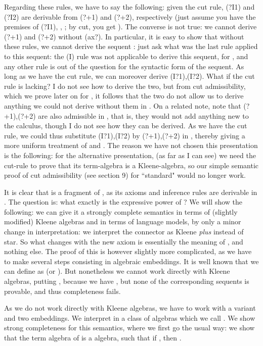 \documentclass{eptcs}
\begin{document}
Regarding these rules, we have to say the following: given 
the cut rule, (?I1) and (?I2) are derivable from (?+1) and (?+2),
respectively (just assume you have the premises of (?I1), 
, ; by cut, you get
). The converse is not true: 
we cannot derive (?+1) and (?+2) without (ax?). In particular, it is easy to 
show that without these rules, we cannot derive the sequent
: just ask what was the
last rule applied to this sequent: the 
(I) rule was not applicable to derive this sequent, 
for , and any other rule is out of 
the question for the syntactic form of the sequent.
As long as we have the cut rule, we can moreover
derive (I?1),(I?2). What if the cut rule is lacking? I
do not see how to derive the two, but from 
cut admissibility, which we prove later on
for , it follows that the two do not allow
us to derive anything we could not derive without them in
 . 
On a related note, note that
(?+1),(?+2) are also admissible in , that is, they would not
add anything new to the calculus, though I do not see how they 
can be derived. As we have the cut rule, we could thus
substitute (I?1),(I?2) by (?+1),(?+2) in , thereby 
giving a more uniform treatment of  and . The 
reason we have not chosen this presentation is the 
following: for the alternative
presentation, (as far as I can see) 
we need the cut-rule to prove that its term-algebra is a Kleene-algebra,
so our simple semantic proof of cut admissibility (see section 9)
for ``standard"  would no longer work.





It is clear that  is a fragment 
of , as its axioms and inference rules
are derivable in . The question is: what exactly is the expressive
power of ? We will show the following: we can give it
a strongly complete semantics
in terms of (slightly modified) Kleene algebras and in terms of language models,
by only a minor change in interpretation: we interpret 
the connector  as Kleene \textit{plus} instead of star. So
what changes with the new axiom is essentially the meaning of ,
and nothing else. The proof of this is however slightly more
complicated, as we have to make several steps consisting in algebraic
embeddings. It is well known that we can 
define  as  (or ). But nonetheless we cannot
work directly with Kleene algebras, putting 
, because we have
, but none of the corresponding sequents is provable,
and thus completeness fails.

As we do not work directly with
Kleene algebras, we have to work with a variant and two embeddings.
We interpret  in a class of algebras
which we call . We show strong completeness for this 
semantics, where we first go
the usual way: we show that the term 
algebra  of  is a 
 algebra, such that if , 
then . 
\end{document}
